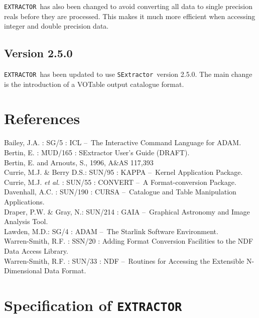 \documentclass[twoside,11pt]{article}
\newcommand{\xref}[3]{#1}
\newcommand{\xlabel}[1]{}
\renewcommand{\_}{\texttt{\symbol{95}}}
\newcommand{\EXTRACTOR}{\texttt{EXTRACTOR}}
\newcommand{\SExtractor}{\texttt{SExtractor}}
\newcommand{\dash}{--}
\newcommand{\dash}{-}
\begin{document}
 \EXTRACTOR\ has also been changed to avoid converting all data to single
 precision reals before they are processed. This makes it much more efficient
 when accessing integer and double precision data.

\subsection{Version 2.5.0}

  \EXTRACTOR\ has been updated to use \SExtractor\ version 2.5.0. The
  main change is the introduction of a VOTable output catalogue
  format.



\section{\xlabel{references}References}
Bailey, J.A. : \xref{SG/5}{sg5}{} : ICL \dash\ The Interactive Command Language for ADAM.\\
Bertin, E. : MUD/165 : SExtractor User's Guide (DRAFT).\\
Bertin, E. and Arnouts, S., 1996, A\&AS 117,393\\
Currie, M.J. \& Berry D.S.: \xref{SUN/95}{sun95}{} : KAPPA \dash\ Kernel Application Package.\\
Currie, M.J. \textit{et al.} : \xref{SUN/55}{sun55}{} : CONVERT \dash\ A Format-conversion Package.\\
Davenhall, A.C. : \xref{SUN/190}{sun190}{} : CURSA \dash\ Catalogue and Table Manipulation Applications.\\
Draper, P.W. \& Gray, N.: \xref{SUN/214}{sun214}{} : GAIA \dash\ Graphical Astronomy and Image Analysis Tool.\\
Lawden, M.D.: \xref{SG/4}{sg4}{} : ADAM \dash\ The Starlink Software Environment.\\
Warren-Smith, R.F. : \xref{SSN/20}{ssn20}{} : Adding Format Conversion Facilities to the NDF Data Access Library.\\
Warren-Smith, R.F. : \xref{SUN/33}{sun33}{} : NDF \dash\ Routines for Accessing the Extensible N-Dimensional Data Format.\\

\newpage
\appendix
\section{\xlabel{specification_of_extractor}Specification of \EXTRACTOR}
\end{document}
